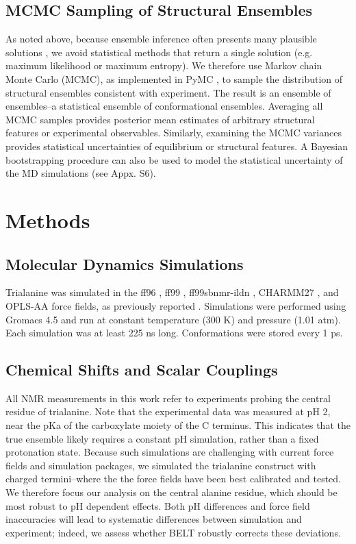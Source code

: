 \documentclass[11pt,titlepage]{article}
\begin{document}
\subsection*{MCMC Sampling of Structural Ensembles}

As noted above, because ensemble inference often presents many plausible solutions  \citep{fisher2010, rieping2005}, we avoid statistical methods that return a single solution (e.g. maximum likelihood or maximum entropy).  We therefore use Markov chain Monte Carlo (MCMC), as implemented in PyMC  \citep{patil2010pymc}, to sample the distribution of structural ensembles consistent with experiment.  The result is an ensemble of ensembles--a statistical ensemble of conformational ensembles.  Averaging all MCMC samples provides posterior mean  estimates of arbitrary structural features or experimental observables.  Similarly, examining the MCMC variances provides statistical uncertainties of equilibrium or structural features.  A Bayesian bootstrapping procedure  \citep{rubin1981} can also be used to model the statistical uncertainty of the MD simulations (see Appx. S6).

\section*{Methods}

\subsection*{Molecular Dynamics Simulations}

Trialanine was simulated in the ff96 \citep{kollman1996}, ff99 \citep{wang2000}, ff99sbnmr-ildn \citep{li2010, Lindorff-Larsen2010}, CHARMM27 \citep{mackerell2004extending,bjelkmar2010implementation}, and OPLS-AA \citep{kaminski2001evaluation} force fields, as previously reported  \citep{beauchamp2012protein}.  Simulations were performed using Gromacs 4.5  \citep{hess2008} and run at constant temperature (300 K) and pressure (1.01 atm).  Each simulation was at least 225 ns long.  Conformations were stored every 1 ps.  

\subsection*{Chemical Shifts and Scalar Couplings}

All NMR measurements in this work refer to experiments  \citep{Graf2007} probing the central residue of trialanine.  Note that the experimental data was measured at pH 2, near the pKa of the carboxylate moiety of the C terminus.  This indicates that the true ensemble likely requires a constant pH simulation, rather than a fixed protonation state.  Because such simulations are challenging with current force fields and simulation packages, we simulated the trialanine construct with charged termini--where the the force fields have been best calibrated and tested.  We therefore focus our analysis on the central alanine residue, which should be most robust to pH dependent effects.  Both pH differences and force field inaccuracies will lead to systematic differences  between simulation and experiment; indeed, we assess whether BELT robustly corrects these deviations.  
\end{document}
